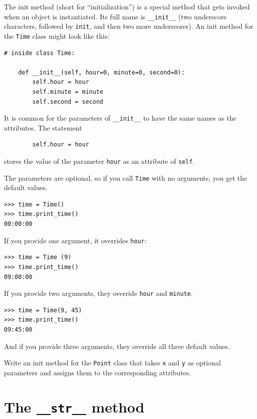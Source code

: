 \documentclass[10pt]{book}
\begin{document}
\begin{CJK}{UTF8}{gbsn}
The init method (short for ``initialization'') is
a special method that gets invoked when an object is instantiated.  
Its full name is \verb"__init__" (two underscore characters,
followed by {\tt init}, and then two more underscores).  An
init method for the {\tt Time} class might look like this:

\begin{verbatim}
# inside class Time:

    def __init__(self, hour=0, minute=0, second=0):
        self.hour = hour
        self.minute = minute
        self.second = second
\end{verbatim}
%
It is common for the parameters of \verb"__init__"
to have the same names as the attributes.  The statement

\begin{verbatim}
        self.hour = hour
\end{verbatim}
%
stores the value of the parameter {\tt hour} as an attribute
of {\tt self}.

The parameters are optional, so if you call {\tt Time} with
no arguments, you get the default values.

\begin{verbatim}
>>> time = Time()
>>> time.print_time()
00:00:00
\end{verbatim}
%
If you provide one argument, it overrides {\tt hour}:

\begin{verbatim}
>>> time = Time (9)
>>> time.print_time()
09:00:00
\end{verbatim}
%
If you provide two arguments, they override {\tt hour} and
{\tt minute}.

\begin{verbatim}
>>> time = Time(9, 45)
>>> time.print_time()
09:45:00
\end{verbatim}
%
And if you provide three arguments, they override all three
default values.


\begin{exercise}

Write an init method for the {\tt Point} class that takes
{\tt x} and {\tt y} as optional parameters and assigns
them to the corresponding attributes.
\end{exercise}


\section{The {\tt \_\_str\_\_} method}


\end{CJK}
\end{document}
